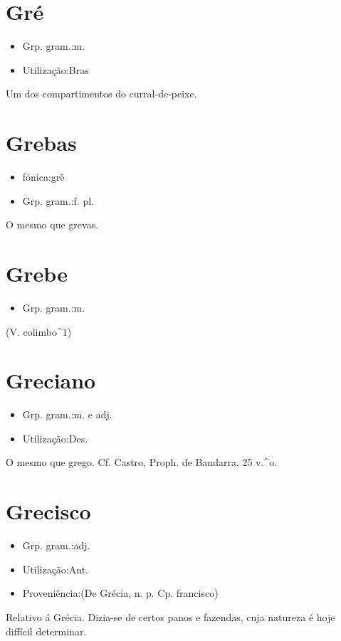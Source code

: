 \section{Gré}
\begin{itemize}
\item {Grp. gram.:m.}
\end{itemize}
\begin{itemize}
\item {Utilização:Bras}
\end{itemize}
Um dos compartimentos do curral-de-peixe.
\section{Grebas}
\begin{itemize}
\item {fónica:grê}
\end{itemize}
\begin{itemize}
\item {Grp. gram.:f. pl.}
\end{itemize}
O mesmo que \textunderscore grevas\textunderscore .
\section{Grebe}
\begin{itemize}
\item {Grp. gram.:m.}
\end{itemize}
(V. \textunderscore colimbo\textunderscore ^1)
\section{Greciano}
\begin{itemize}
\item {Grp. gram.:m.  e  adj.}
\end{itemize}
\begin{itemize}
\item {Utilização:Des.}
\end{itemize}
O mesmo que \textunderscore grego\textunderscore . Cf. Castro, \textunderscore Proph. de Bandarra\textunderscore , 25 v.^o.
\section{Grecisco}
\begin{itemize}
\item {Grp. gram.:adj.}
\end{itemize}
\begin{itemize}
\item {Utilização:Ant.}
\end{itemize}
\begin{itemize}
\item {Proveniência:(De \textunderscore Grécia\textunderscore , n. p. Cp. \textunderscore francisco\textunderscore )}
\end{itemize}
Relativo á Grécia.
Dizia-se de certos panos e fazendas, cuja natureza é hoje diffícil determinar.
